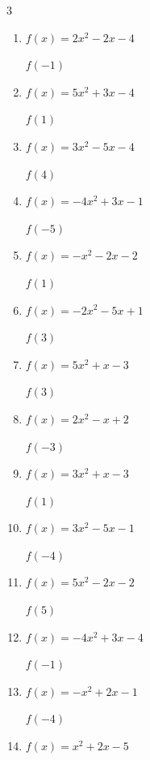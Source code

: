 \begin{multicols}{3}
\begin{enumerate}
$f(-5)$
        \phantom{$= 78$}

  \item $f(x)=2x^{2}-2x-4$

$f(-1)$
        \phantom{$= 0$}

  \item $f(x)=5x^{2}+3x-4$

$f(1)$
        \phantom{$= 4$}

  \item $f(x)=3x^{2}-5x-4$

$f(4)$
        \phantom{$= 24$}

  \item $f(x)=-4x^{2}+3x-1$

$f(-5)$
        \phantom{$= -116$}

  \item $f(x)=-x^{2}-2x-2$

$f(1)$
        \phantom{$= -5$}

  \item $f(x)=-2x^{2}-5x+1$

$f(3)$
        \phantom{$= -32$}

  \item $f(x)=5x^{2}+x-3$

$f(3)$
        \phantom{$= 45$}

\columnbreak %

\resetques

  \item $f(x)=2x^{2}-x+2$

$f(-3)$
        \phantom{$= 23$}

  \item $f(x)=3x^{2}+x-3$

$f(1)$
        \phantom{$= 1$}

  \item $f(x)=3x^{2}-5x-1$

$f(-4)$
        \phantom{$= 67$}

  \item $f(x)=5x^{2}-2x-2$

$f(5)$
        \phantom{$= 113$}

  \item $f(x)=-4x^{2}+3x-4$

$f(-1)$
        \phantom{$= -11$}

  \item $f(x)=-x^{2}+2x-1$

$f(-4)$
        \phantom{$= -25$}

  \item $f(x)=x^{2}+2x-5$


\end{enumerate}
\end{multicols}
